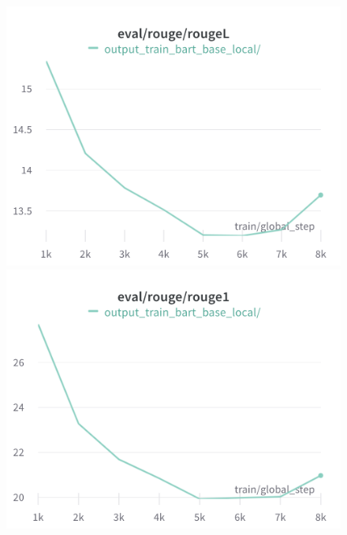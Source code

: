 \begin{figure}[!htb]
\includegraphics[width=\linewidth]{wandb/charts/Section-6-Panel-2-58cklx5fa}
\caption{}
\endminipage\hfill
{}
\includegraphics[width=\linewidth]{wandb/charts/Section-6-Panel-3-mu3n5ufdz}
\caption{}
\endminipage
\end{figure}

